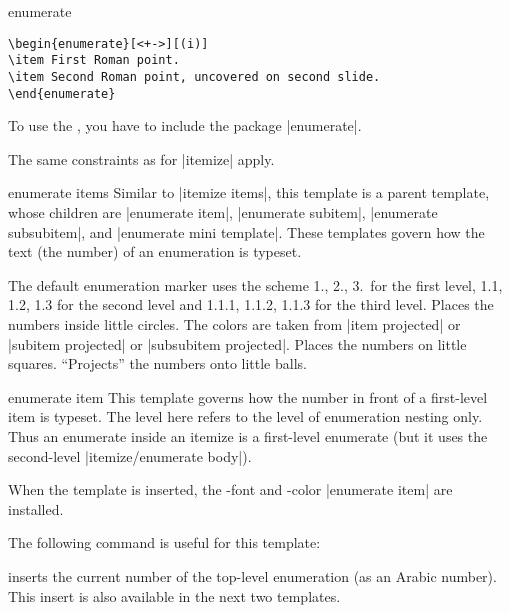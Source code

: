 \begin{environment}{{enumerate}}
\begin{verbatim}
\begin{enumerate}[<+->][(i)]
\item First Roman point.
\item Second Roman point, uncovered on second slide.
\end{enumerate}
\end{verbatim}

  \articlenote
  To use the , you have to include the package
  |enumerate|.

  \lyxnote
  The same constraints as for |itemize| apply.

  \begin{element}{enumerate items}\semiyes\no\no
    Similar to |itemize items|, this template is a parent template,
    whose children are |enumerate item|, |enumerate subitem|,
    |enumerate subsubitem|, and |enumerate mini template|. These
    templates govern how the text (the number) of an enumeration is
    typeset.

    \begin{templateoptions}
      The default enumeration marker uses the scheme 1., 2., 3.\ for
      the first level, 1.1, 1.2, 1.3 for the second level and 1.1.1,
      1.1.2, 1.1.3 for the third level.
      Places the numbers inside little circles. The colors are taken
      from |item projected| or |subitem projected| or
      |subsubitem projected|.
      Places the numbers on little squares.
      ``Projects'' the numbers onto little balls.
    \end{templateoptions}
  \end{element}

  \begin{element}{enumerate item}\yes\yes\yes
    This template governs how the number in front of a first-level
    item is typeset. The level here refers to the level of enumeration
    nesting only. Thus an enumerate inside an itemize is a first-level
    enumerate (but it uses the second-level
    |itemize/enumerate body|).

    When the template is inserted, the \beamer-font and -color
    |enumerate item| are installed.

    The following command is useful for this template:
    \begin{templateinserts}
      \iteminsert{\insertenumlabel}
      inserts the current number of the top-level enumeration (as an
      Arabic number). This insert is also available in the next two
      templates.
    \end{templateinserts}
  \end{element}


\end{environment}
